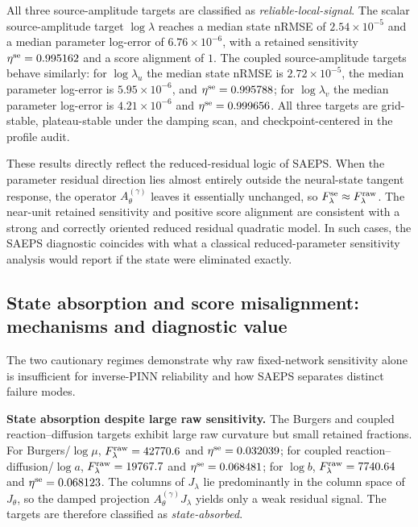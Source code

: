 \documentclass[preprint,12pt]{elsarticle}
\newcommand{\Fraw}{F_{\lambda}^{\rm raw}}
\newcommand{\classlabel}[1]{\textnormal{\emph{#1}}}
\begin{document}
All three source-amplitude targets are classified as \classlabel{reliable-local-signal}. The scalar source-amplitude target $\log\lambda$ reaches a median state nRMSE of $2.54\times10^{-5}$ and a median parameter log-error of $6.76\times10^{-6}$, with a retained sensitivity $\eta^{\rm se}=0.995162$ and a score alignment of $1$. The coupled source-amplitude targets behave similarly: for $\log\lambda_u$ the median state nRMSE is $2.72\times10^{-5}$, the median parameter log-error is $5.95\times10^{-6}$, and $\eta^{\rm se}=0.995788$; for $\log\lambda_v$ the median parameter log-error is $4.21\times10^{-6}$ and $\eta^{\rm se}=0.999656$. All three targets are grid-stable, plateau-stable under the damping scan, and checkpoint-centered in the profile audit.

These results directly reflect the reduced-residual logic of SAEPS. When the parameter residual direction lies almost entirely outside the neural-state tangent response, the operator $A_\theta^{(\gamma)}$ leaves it essentially unchanged, so $F_{\lambda}^{\rm se}\approx F_{\lambda}^{\rm raw}$. The near-unit retained sensitivity and positive score alignment are consistent with a strong and correctly oriented reduced residual quadratic model. In such cases, the SAEPS diagnostic coincides with what a classical reduced-parameter sensitivity analysis would report if the state were eliminated exactly.

\subsection{State absorption and score misalignment: mechanisms and diagnostic value}

The two cautionary regimes demonstrate why raw fixed-network sensitivity alone is insufficient for inverse-PINN reliability and how SAEPS separates distinct failure modes.

\medskip\noindent
\textbf{State absorption despite large raw sensitivity.}
The Burgers and coupled reaction--diffusion targets exhibit large raw curvature but small retained fractions. For Burgers/$\log\mu$, $\Fraw=42770.6$ and $\eta^{\rm se}=0.032039$; for coupled reaction--diffusion/$\log a$, $\Fraw=19767.7$ and $\eta^{\rm se}=0.068481$; for $\log b$, $\Fraw=7740.64$ and $\eta^{\rm se}=0.068123$. The columns of $J_\lambda$ lie predominantly in the column space of $J_\theta$, so the damped projection $A_\theta^{(\gamma)}J_\lambda$ yields only a weak residual signal. The targets are therefore classified as \classlabel{state-absorbed}.
\end{document}
